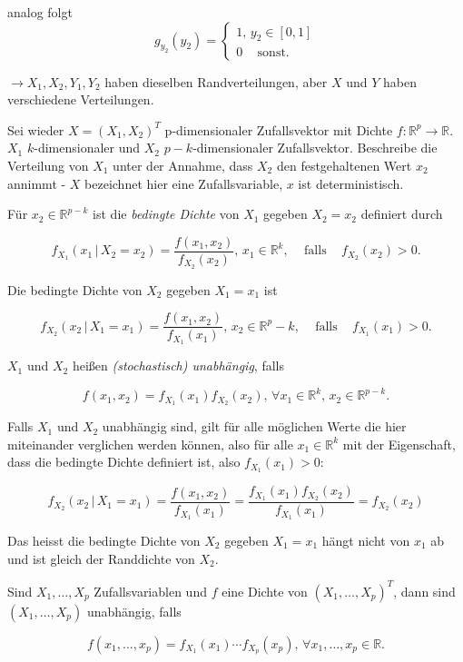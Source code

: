 \documentclass[12pt, a4paper]{article}
\theoremstyle{plain}
\theoremstyle{definition}
\newcommand{\R}{\mathbb{R}}
\newcommand{\1}{\mathds{1}}
\providecommand{\mtext}[1]{\quad \text{#1} \quad}
\begin{document}
analog folgt 
\[ g_{y_2}(y_2) = 
\begin{cases} 1, \, y_2 \in [0,1] \\
0 \, \mtext{sonst.} \end{cases} \]

$\rightarrow X_1, X_2, Y_1, Y_2$ haben dieselben Randverteilungen, aber $X$ und $Y$ haben verschiedene Verteilungen.



Sei wieder $X = (X_1, X_2)^T$ p-dimensionaler Zufallsvektor mit Dichte $f: \R^p \to \R$. $X_1$ $k$-dimensionaler und $X_2$ $p-k$-dimensionaler Zufallsvektor. Beschreibe die Verteilung von $X_1$ unter der Annahme, dass $X_2$ den festgehaltenen Wert $x_2$ annimmt - $X$ bezeichnet hier eine Zufallsvariable, $x$ ist deterministisch.

Für $x_2 \in \R^{p-k}$ ist die \emph{bedingte Dichte} von $X_1$ gegeben $X_2 = x_2$ definiert durch 

\[ f_{X_1}(x_1 \, | \,  X_2 = x_2) = \frac{f(x_1, x_2)}{f_{X_2} (x_2) } , \, x_1 \in \R^k, \, \mtext{falls} \, f_{X_2}(x_2) > 0. \]

Die bedingte Dichte von $X_2$ gegeben $X_1 = x_1$ ist

\[ f_{X_2}(x_2 \, | \, X_1 = x_1) = \frac{f(x_1, x_2)}{f_{X_1} (x_1) } , \, x_2 \in \R^p-k, \, \mtext{falls} \, f_{X_1}(x_1) > 0. \]

$X_1$ und $X_2$ heißen \emph{(stochastisch) unabhängig}, falls 

\[ f(x_1, x_2) = f_{X_1}(x_1) f_{X_2}(x_2), \, \forall x_1 \in \R^k, \,  x_2 \in \R^{p-k}. \]

Falls $X_1$ und $X_2$ unabhängig sind, gilt für alle möglichen Werte die hier miteinander verglichen werden können, also für alle $x_1 \in \R^k$ mit der Eigenschaft, dass die bedingte Dichte definiert ist, also $f_{X_1}(x_1) > 0$:

\[ f_{X_2}(x_2 \, | \,  X_1 = x_1) = \frac{f(x_1, x_2)}{f_{X_1} (x_1)} =  \frac{f_{X_1}(x_1) f_{X_2} (x_2)}{f_{X_1} (x_1)} = f_{X_2}(x_2) \]

Das heisst die bedingte Dichte von $X_2$ gegeben $X_1 = x_1$ hängt nicht von $x_1$ ab und ist gleich der Randdichte von $X_2$.

Sind $X_1, \ldots, X_p$ Zufallsvariablen und $f$ eine Dichte von $(X_1, \ldots, X_p)^T$, dann sind $(X_1, \ldots, X_p)$ unabhängig, falls

\[ f(x_1, \ldots, x_p) = f_{X_1}(x_1) \cdots f_{X_p}(x_p), \, \forall x_1, \ldots, x_p \in \R. \]
\end{document}

